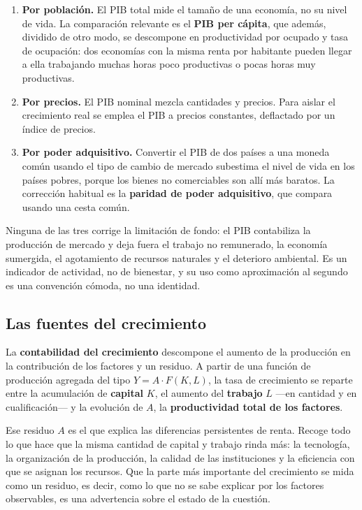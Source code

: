 \begin{enumerate}
    \item \textbf{Por población.} El PIB total mide el tamaño de una economía,
    no su nivel de vida. La comparación relevante es el \textbf{PIB per
    cápita}, que además, dividido de otro modo, se descompone en productividad
    por ocupado y tasa de ocupación: dos economías con la misma renta por
    habitante pueden llegar a ella trabajando muchas horas poco productivas o
    pocas horas muy productivas.
    \item \textbf{Por precios.} El PIB nominal mezcla cantidades y precios. Para
    aislar el crecimiento real se emplea el PIB a precios constantes, deflactado
    por un índice de precios.
    \item \textbf{Por poder adquisitivo.} Convertir el PIB de dos países a una
    moneda común usando el tipo de cambio de mercado subestima el nivel de vida
    en los países pobres, porque los bienes no comerciables son allí más
    baratos. La corrección habitual es la \textbf{paridad de poder
    adquisitivo}, que compara usando una cesta común.
\end{enumerate}

Ninguna de las tres corrige la limitación de fondo: el PIB contabiliza la
producción de mercado y deja fuera el trabajo no remunerado, la economía
sumergida, el agotamiento de recursos naturales y el deterioro ambiental. Es un
indicador de actividad, no de bienestar, y su uso como aproximación al segundo
es una convención cómoda, no una identidad.

\subsection{Las fuentes del crecimiento}

La \textbf{contabilidad del crecimiento} descompone el aumento de la producción
en la contribución de los factores y un residuo. A partir de una función de
producción agregada del tipo $Y = A \cdot F(K, L)$, la tasa de crecimiento se
reparte entre la acumulación de \textbf{capital} $K$, el aumento del
\textbf{trabajo} $L$ —en cantidad y en cualificación— y la evolución de $A$, la
\textbf{productividad total de los factores}.

Ese residuo $A$ es el que explica las diferencias persistentes de renta. Recoge
todo lo que hace que la misma cantidad de capital y trabajo rinda más: la
tecnología, la organización de la producción, la calidad de las instituciones y
la eficiencia con que se asignan los recursos. Que la parte más importante del
crecimiento se mida como un residuo, es decir, como lo que no se sabe explicar
por los factores observables, es una advertencia sobre el estado de la cuestión.

